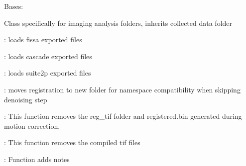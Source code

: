 \documentclass[letterpaper,10pt,english]{sphinxmanual}
\begin{document}
\begin{fulllineitems}
\label{\detokenize{ExperimentHierarchy:ExperimentHierarchy.CollectedImagingAnalysisFolder}}
\pysigstartsignatures
{}
\pysigstopsignatures
\sphinxAtStartPar
Bases: {\hyperref[\detokenize{ExperimentHierarchy:ExperimentHierarchy.CollectedDataFolder}]{}}

\sphinxAtStartPar
Class specifically for imaging analysis folders, inherits collected data folder
\begin{description}
\begin{DUlineblock}{0em}
\item[]  : loads fissa exported files
\item[]  : loads cascade exported files
\item[]  : loads suite2p exported files
\item[]  : moves registration to new folder for namespace compatibility when skipping denoising step
\item[]  : This function removes the reg\_tif folder and registered.bin generated during motion correction.
\item[]  : This function removes the compiled tif files
\item[]  : Function adds notes
\end{DUlineblock}

\end{description}


\end{fulllineitems}
\end{document}
